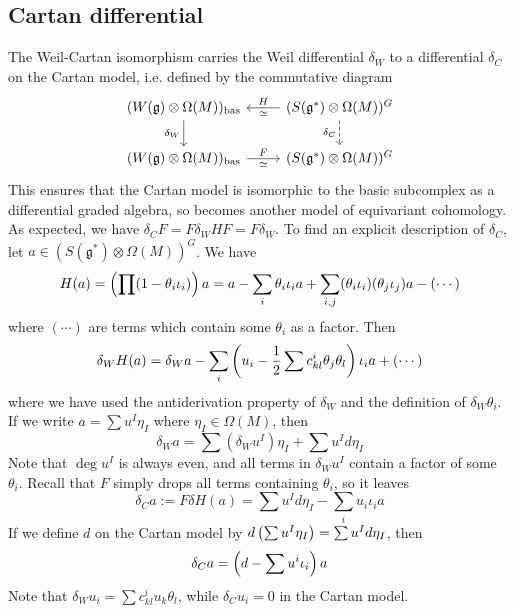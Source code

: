 \subsection{Cartan differential}
The Weil-Cartan isomorphism carries the Weil differential $\delta_W$ to a
differential $\delta_C$ on the Cartan model, i.e. defined by
the commutative diagram 
\[\begin{tikzcd}
		{(W(\mathfrak{g})\otimes\Omega(M))_{\text{bas}}} &
		{(S(\mathfrak{g}^*)\otimes\Omega(M))^G} \\
			{(W(\mathfrak{g})\otimes\Omega(M))_{\text{bas}}} &
			{(S(\mathfrak{g}^*)\otimes\Omega(M))^G}
				\arrow["{\delta_W}"', from=1-1, to=2-1]
					\arrow["{\delta_C}"', dashed, from=1-2, to=2-2]
					\arrow["H"', "\simeq", from=1-2, to=1-1]
							\arrow["F","\simeq"', from=2-1, to=2-2]
\end{tikzcd}\]
This ensures that the Cartan model is isomorphic to the basic subcomplex as a
differential graded algebra, so becomes another model of equivariant
cohomology. As expected, we have $\delta_C F = F\delta_W H F = F\delta_W$.
To find an explicit description of $\delta_C$, let 
$a\in (S(\mathfrak{g}^*)\otimes\Omega(M))^G$. We have
\[
H(a) = \paren{\prod(1-\theta_i \iota_i)} a
= a - \sum_i \theta_i \iota_i a + \sum_{i,j} (\theta_i\iota_i)(\theta_j\iota_j)a
- (\cdots)
\] 
where $(\cdots)$ are terms which contain some $\theta_i$ as a factor. 
Then 
\[
\delta_W H(a) = \delta_W a - \sum_{i} \paren{u_i - \frac{1}{2}\sum
c_{kl}^i\theta_j\theta_l}\iota_i a + (\cdots)
\] 
where we have used the antiderivation property of $\delta_W$ and the definition
of  $\delta_W\theta_i$.  If we write $a= \sum u^I \eta_I$ where  $\eta_I \in
\Omega(M)$, then 
 \[
\delta_W a = \sum (\delta_W u^I)\eta_I + \sum u^I d\eta_I
\] 
Note that $\deg u^I$ is always even, and all terms in $\delta_W u^I$ contain a
factor of some $\theta_i$. 
Recall that  $F$ simply drops all terms containing $\theta_i$, so it leaves
\begin{equation*}
	\delta_C a := F\delta H(a) = \sum u^I d\eta_I - \sum_i u_i \iota_i a
\end{equation*} 
If we define $d$ on the Cartan model by  $d \paren{\sum u^I \eta_I} = \sum u^I
d\eta_I$, then
\begin{equation}
	\delta_C a = \paren{d - \sum u^i \iota_i} a
\end{equation}
Note that $\delta_W u_i = \sum c_{kl}^iu_k\theta_l$, while 
$\delta_C u_i = 0$ in the Cartan model. 


